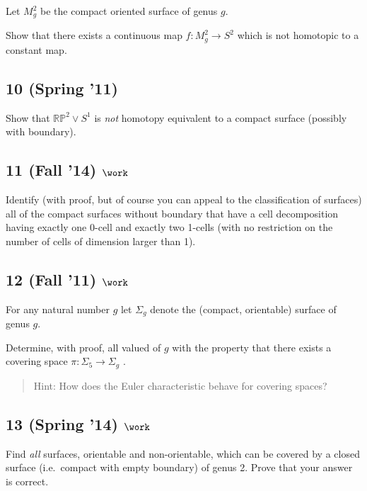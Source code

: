 Let \(M_g^2\) be the compact oriented surface of genus \(g\).

Show that there exists a continuous map \(f : M_g^2 \to S^2\) which is
not homotopic to a constant map.

\hypertarget{spring-11}{%
\subsection{10 (Spring '11)}\label{spring-11}}

Show that \({\mathbb{RP}}^2 \lor S^1\) is \emph{not} homotopy equivalent
to a compact surface (possibly with boundary).

\hypertarget{fall-14-work-4}{%
\subsection{\texorpdfstring{11 (Fall '14)
\(\work\)}{11 (Fall '14) \textbackslash work}}\label{fall-14-work-4}}

Identify (with proof, but of course you can appeal to the classification
of surfaces) all of the compact surfaces without boundary that have a
cell decomposition having exactly one 0-cell and exactly two 1-cells
(with no restriction on the number of cells of dimension larger than 1).

\hypertarget{fall-11-work-3}{%
\subsection{\texorpdfstring{12 (Fall '11)
\(\work\)}{12 (Fall '11) \textbackslash work}}\label{fall-11-work-3}}

For any natural number \(g\) let \(\Sigma_g\) denote the (compact,
orientable) surface of genus \(g\).

Determine, with proof, all valued of \(g\) with the property that there
exists a covering space \(\pi : \Sigma_5 \to \Sigma_g\) .

\begin{quote}
Hint: How does the Euler characteristic behave for covering spaces?
\end{quote}

\hypertarget{spring-14-work-2}{%
\subsection{\texorpdfstring{13 (Spring '14)
\(\work\)}{13 (Spring '14) \textbackslash work}}\label{spring-14-work-2}}

Find \emph{all} surfaces, orientable and non-orientable, which can be
covered by a closed surface (i.e.~compact with empty boundary) of genus
2. Prove that your answer is correct.

